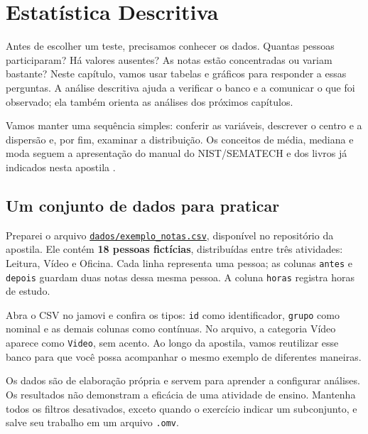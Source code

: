\chapter{Estatística Descritiva}
\label{cap:descritiva}

Antes de escolher um teste, precisamos conhecer os dados. Quantas pessoas participaram? Há valores ausentes? As notas estão concentradas ou variam bastante? Neste capítulo, vamos usar tabelas e gráficos para responder a essas perguntas. A análise descritiva ajuda a verificar o banco e a comunicar o que foi observado; ela também orienta as análises dos próximos capítulos.

Vamos manter uma sequência simples: conferir as variáveis, descrever o centro e a dispersão e, por fim, examinar a distribuição. Os conceitos de média, mediana e moda seguem a apresentação do manual do NIST/SEMATECH e dos livros já indicados nesta apostila \parencite{NISTCentro,Triola2017}.

\section{Um conjunto de dados para praticar}

Preparei o arquivo \href{https://github.com/erickfaria/apostilaJamovi/blob/main/dados/exemplo_notas.csv}{\texttt{dados/exemplo\_notas.csv}}, disponível no repositório da apostila. Ele contém \textbf{18 pessoas fictícias}, distribuídas entre três atividades: Leitura, Vídeo e Oficina. Cada linha representa uma pessoa; as colunas \texttt{antes} e \texttt{depois} guardam duas notas dessa mesma pessoa. A coluna \texttt{horas} registra horas de estudo.

Abra o CSV no jamovi e confira os tipos: \texttt{id} como identificador, \texttt{grupo} como nominal e as demais colunas como contínuas. No arquivo, a categoria Vídeo aparece como \texttt{Video}, sem acento. Ao longo da apostila, vamos reutilizar esse banco para que você possa acompanhar o mesmo exemplo de diferentes maneiras.

\begin{tcolorbox}[colback=white,colframe=green,title={Dica de Conteúdo}]
Os dados são de elaboração própria e servem para aprender a configurar análises. Os resultados não demonstram a eficácia de uma atividade de ensino. Mantenha todos os filtros desativados, exceto quando o exercício indicar um subconjunto, e salve seu trabalho em um arquivo \texttt{.omv}.
\end{tcolorbox}

